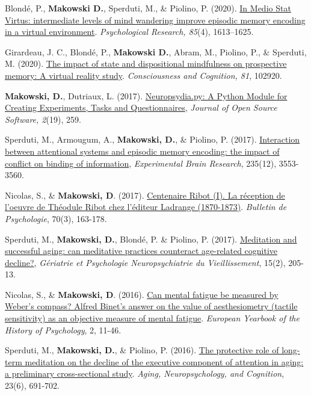 \documentclass[11pt,a4paper,]{awesome-cv}
\begin{document}
Blondé, P., \textbf{Makowski D.}, Sperduti, M., \& Piolino, P. (2020).
\href{https://dominiquemakowski.github.io/publication/blonde2020medio/blonde2020medio.pdf}{In
Medio Stat Virtus: intermediate levels of mind wandering improve
episodic memory encoding in a virtual environment}. \emph{Psychological
Research, 85}(4), 1613--1625.

Girardeau, J. C., Blondé, P., \textbf{Makowski D.}, Abram, M., Piolino,
P., \& Sperduti, M. (2020).
\href{https://dominiquemakowski.github.io/publication/girardeau2020impact/girardeau2020impact.pdf}{The
impact of state and dispositional mindfulness on prospective memory: A
virtual reality study}. \emph{Consciousness and Cognition, 81}, 102920.

\textbf{Makowski, D.}, Dutriaux, L. (2017).
\href{https://joss.theoj.org/papers/10.21105/joss.00259}{Neuropsydia.py:
A Python Module for Creating Experiments, Tasks and Questionnaires},
\emph{Journal of Open Source Software, 2}(19), 259.

Sperduti, M., Armougum, A., \textbf{Makowski, D.}, \& Piolino, P.
(2017).
\href{https://dominiquemakowski.github.io/publication/sperduti2017interaction/sperduti2017interaction.pdf}{Interaction
between attentional systems and episodic memory encoding: the impact of
conflict on binding of information}, \emph{Experimental Brain Research},
235(12), 3553-3560.

Nicolas, S., \& \textbf{Makowski, D}. (2017).
\href{https://dominiquemakowski.github.io/publication/nicolas2017centenaire/nicolas2017centenaire.pdf}{Centenaire
Ribot (I). La réception de l'oeuvre de Théodule Ribot chez l'éditeur
Ladrange (1870-1873)}. \emph{Bulletin de Psychologie}, 70(3), 163-178.

Sperduti, M., \textbf{Makowski, D.}, Blondé, P. \& Piolino, P. (2017).
\href{https://dominiquemakowski.github.io/publication/sperduti2017meditation/sperduti2017meditation.pdf}{Meditation
and successful aging: can meditative practices counteract age-related
cognitive decline?}, \emph{Gériatrie et Psychologie Neuropsychiatrie du
Vieillissement}, 15(2), 205-13.

Nicolas, S., \& \textbf{Makowski, D}. (2016).
\href{https://dominiquemakowski.github.io/publication/nicolas2016can/nicolas2016can.pdf}{Can
mental fatigue be measured by Weber's compass? Alfred Binet's answer on
the value of aesthesiometry (tactile sensitivity) as an objective
measure of mental fatigue}. \emph{European Yearbook of the History of
Psychology}, 2, 11-46.

Sperduti, M., \textbf{Makowski, D.}, \& Piolino, P. (2016).
\href{https://dominiquemakowski.github.io/publication/sperduti2016protective/sperduti2016protective.pdf}{The
protective role of long-term meditation on the decline of the executive
component of attention in aging: a preliminary cross-sectional study}.
\emph{Aging, Neuropsychology, and Cognition}, 23(6), 691-702.
\end{document}
